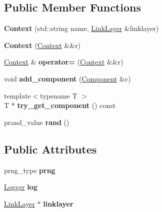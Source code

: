 \subsection*{Public Member Functions}
\begin{DoxyCompactItemize}
\item 
\hypertarget{structsma_1_1Context_ae8754ff06a37b2b2a041336d1b0b2f90}{{\bfseries Context} (std\-::string name, \hyperlink{classsma_1_1LinkLayer}{Link\-Layer} \&linklayer)}\label{structsma_1_1Context_ae8754ff06a37b2b2a041336d1b0b2f90}

\item 
\hypertarget{structsma_1_1Context_a9f852acb4f4f0d0c6e671067459fad47}{{\bfseries Context} (\hyperlink{structsma_1_1Context}{Context} \&\&r)}\label{structsma_1_1Context_a9f852acb4f4f0d0c6e671067459fad47}

\item 
\hypertarget{structsma_1_1Context_a3c4bd983bcd0a5a070141713f51551f6}{\hyperlink{structsma_1_1Context}{Context} \& {\bfseries operator=} (\hyperlink{structsma_1_1Context}{Context} \&\&r)}\label{structsma_1_1Context_a3c4bd983bcd0a5a070141713f51551f6}

\item 
\hypertarget{structsma_1_1Context_a70044ab4744a375c2e93ed77a586b0ec}{void {\bfseries add\-\_\-component} (\hyperlink{classsma_1_1Component}{Component} \&c)}\label{structsma_1_1Context_a70044ab4744a375c2e93ed77a586b0ec}

\item 
\hypertarget{structsma_1_1Context_a93f795b66ad3dcdeff8592121f994764}{{\footnotesize template$<$typename T $>$ }\\T $\ast$ {\bfseries try\-\_\-get\-\_\-component} () const }\label{structsma_1_1Context_a93f795b66ad3dcdeff8592121f994764}

\item 
\hypertarget{structsma_1_1Context_a0dd07735a6cae9f43f0217abeebd5fd0}{prand\-\_\-value {\bfseries rand} ()}\label{structsma_1_1Context_a0dd07735a6cae9f43f0217abeebd5fd0}

\end{DoxyCompactItemize}
\subsection*{Public Attributes}
\begin{DoxyCompactItemize}
\item 
\hypertarget{structsma_1_1Context_a8884c30cbbd10b9121059156da57f03f}{prng\-\_\-type {\bfseries prng}}\label{structsma_1_1Context_a8884c30cbbd10b9121059156da57f03f}

\item 
\hypertarget{structsma_1_1Context_a33eacb080f9b3b17bfe032c15e6dbc0a}{\hyperlink{structsma_1_1Logger}{Logger} {\bfseries log}}\label{structsma_1_1Context_a33eacb080f9b3b17bfe032c15e6dbc0a}

\item 
\hypertarget{structsma_1_1Context_a7752557a3d9799e4b24086b9ea52e684}{\hyperlink{classsma_1_1LinkLayer}{Link\-Layer} $\ast$ {\bfseries linklayer}}\label{structsma_1_1Context_a7752557a3d9799e4b24086b9ea52e684}

\end{DoxyCompactItemize}


